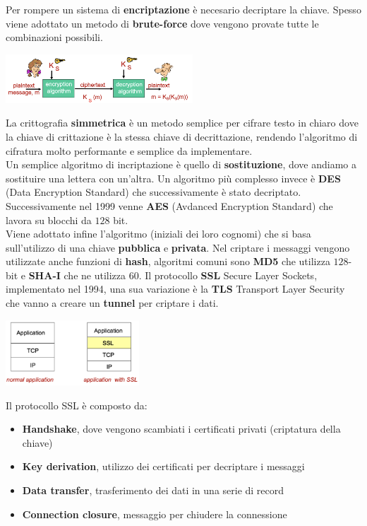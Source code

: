 \documentclass{article}
\begin{document}
Per rompere un sistema di \textbf{encriptazione} è necesario decriptare la chiave. Spesso viene adottato un metodo di \textbf{brute-force} dove vengono provate tutte le combinazioni possibili.
\begin{center}
    \includegraphics[width=7cm]{img/chiaviSimmetriche.png}
\end{center}
La crittografia \textbf{ simmetrica} è un metodo semplice per cifrare testo in chiaro dove la chiave di crittazione è la stessa chiave di decrittazione, rendendo l'algoritmo di cifratura molto performante e semplice da implementare.\\
Un semplice algoritmo di incriptazione è quello di \textbf{sostituzione}, dove andiamo a sostituire una lettera con un'altra. Un algoritmo più complesso invece è \textbf{DES} (Data Encryption Standard) che successivamente è stato decriptato. Successivamente nel 1999 venne \textbf{AES} (Avdanced Encryption Standard) che lavora su  blocchi da $128$ bit.\\ Viene adottato infine l'algoritmo  (iniziali dei loro cognomi) che si basa sull'utilizzo di una chiave \textbf{pubblica} e \textbf{privata}.
Nel criptare i messaggi vengono utilizzate anche funzioni di \textbf{hash}, algoritmi comuni sono \textbf{MD5} che utilizza $128$-bit e \textbf{SHA-I} che ne utilizza $60$.
Il protocollo \textbf{SSL} Secure Layer Sockets, implementato nel 1994, una sua variazione è la \textbf{TLS} Transport Layer Security che vanno a creare un \textbf{tunnel} per criptare i dati.
\begin{center}
  \includegraphics[width=5cm]{img/sslTcp.png}
\end{center}
Il protocollo SSL è composto da:
\begin{itemize}
  \item \textbf{Handshake}, dove vengono scambiati i certificati privati (criptatura della chiave)
  \item \textbf{Key derivation}, utilizzo dei certificati per decriptare i messaggi
  \item \textbf{Data transfer}, trasferimento dei dati in una serie di record
  \item \textbf{Connection closure}, messaggio per chiudere la connessione
\end{itemize}
\end{document}
